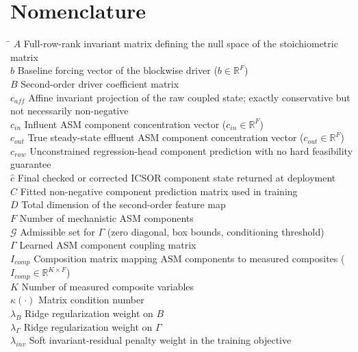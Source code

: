 \documentclass[a4paper,fleqn]{cas-sc}
\DeclareRobustCommand{\currentrev}[1]{{\color{currentRevisionBlue}#1}}
\DeclareRobustCommand{\currentrev}[1]{#1}
\newcommand{\revitem}[2]{#2}
\newenvironment{revblockr110}{}{}
\begin{document}
\section*{\revitem{revRoneTen}{Nomenclature}}
\begin{revblockr110}
\begin{tabbing}
\hspace{2.5cm} \= \kill
$A$ \> Full-row-rank invariant matrix defining the null space of the stoichiometric matrix \\
$b$ \> Baseline forcing vector of the blockwise driver ($b \in \mathbb{R}^{F}$) \\
$B$ \> Second-order driver coefficient matrix \\
$c_{aff}$ \> \currentrev{Affine invariant projection of the raw coupled state; exactly conservative but not necessarily non-negative} \\
$c_{in}$ \> Influent ASM component concentration vector ($c_{in} \in \mathbb{R}^{F}$) \\
$c_{out}$ \> True steady-state effluent ASM component concentration vector ($c_{out} \in \mathbb{R}^{F}$) \\
$c_{raw}$ \> \currentrev{Unconstrained regression-head component prediction with no hard feasibility guarantee} \\
$\hat{c}$ \> \currentrev{Final checked or corrected ICSOR component state returned at deployment} \\
$\widehat{C}$ \> Fitted non-negative component prediction matrix used in training \\
$D$ \> Total dimension of the second-order feature map \\
$F$ \> Number of mechanistic ASM components \\
$\mathcal{G}$ \> Admissible set for $\Gamma$ (zero diagonal, box bounds, conditioning threshold) \\
$\Gamma$ \> Learned ASM component coupling matrix \\
$I_{comp}$ \> Composition matrix mapping ASM components to measured composites ($I_{comp} \in \mathbb{R}^{K \times F}$) \\
$K$ \> Number of measured composite variables \\
$\kappa(\cdot)$ \> Matrix condition number \\
$\lambda_B$ \> Ridge regularization weight on $B$ \\
$\lambda_\Gamma$ \> Ridge regularization weight on $\Gamma$ \\
$\lambda_{inv}$ \> \currentrev{Soft invariant-residual penalty weight in the training objective} \\

\end{tabbing}
\end{revblockr110}
\end{document}

